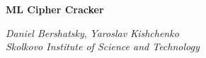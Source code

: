\documentclass[letter,12pt, epsfig]{article}
\begin{document}
\newcommand{\beq}{\begin{equation}}
\newcommand{\eeq}{\end{equation}}
\newcommand{\bea}{\begin{eqnarray}}
\newcommand{\eea}{\end{eqnarray}}
\newcommand{\beas}{\begin{eqnarray*}}
\newcommand{\eeas}{\end{eqnarray*}}
\newcommand{\defi}{\stackrel{\rm def}{=}}
\newcommand{\non}{\nonumber}
\newcommand{\bquo}{\begin{quote}}
\newcommand{\enqu}{\end{quote}}

\hfill
\vspace{18pt}
\begin{center}
    \Large \textbf{ML Cipher Cracker}
\end{center}

\vspace{6pt}
\begin{center}
	\large\textsl{Daniel Bershatsky}, 
	\large\textsl{Yaroslav Kishchenko} \\
    \vspace{25pt}
    \textit{\small  Skolkovo Institute of Science and Technology}\\
    \vspace{6pt}
\end{center}

\vspace{12pt}
\vspace{4pt}



\vspace{1cm}





\begin{thebibliography}{23}

\end{thebibliography}
\end{document}
